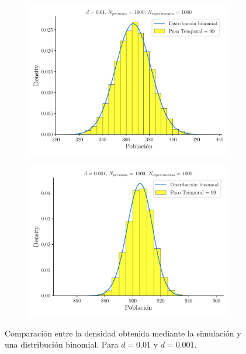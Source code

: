 \documentclass[twocolumn,aps,prl]{revtex4-1}
\begin{document}
\begin{figure}[ht!]
  \centering
  \begin{subfigure}[b]{0.49\linewidth}
      \centering
      \includegraphics[width = 0.999\textwidth]{figuras/ex01-a-ultima_iteracion.pdf}
      \label{fig:figuras/ex01-a-ultima_iteracion}
  \end{subfigure}
  \begin{subfigure}[b]{0.49\linewidth}
      \centering
      \includegraphics[width = 0.999\textwidth]{figuras/ex01-b-ultima_iteracion.pdf}
      \label{fig:figuras/ex01-b-ultima_iteracion}
  \end{subfigure}
  \caption{Comparación entre la densidad obtenida mediante la simulación y una distribución binomial. Para $d=0.01$ y $d=0.001$.}
  \label{fig:figuras/ex01-ultima_iteracion}
\end{figure}
\end{document}
